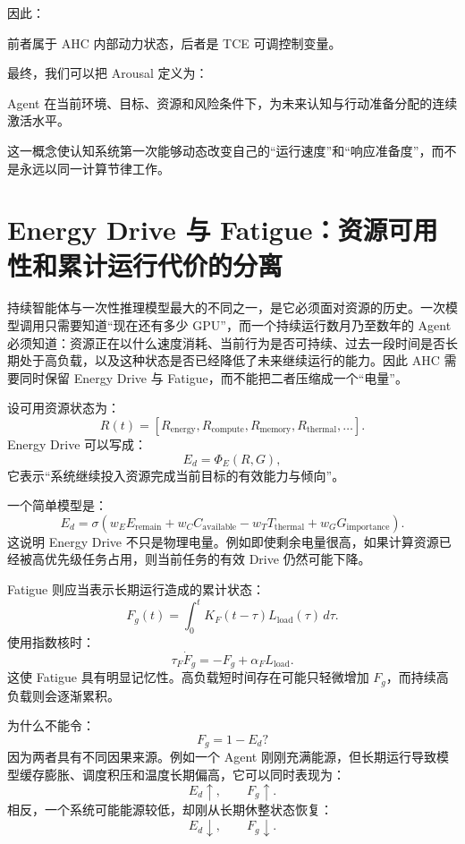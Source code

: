 因此：
\begin{statementbox}
\centering
{}
\end{statementbox}
前者属于 AHC 内部动力状态，后者是 TCE 可调控制变量。

最终，我们可以把 Arousal 定义为：
\begin{definition*}
Agent 在当前环境、目标、资源和风险条件下，为未来认知与行动准备分配的连续激活水平。
\end{definition*}
这一概念使认知系统第一次能够动态改变自己的“运行速度”和“响应准备度”，而不是永远以同一计算节律工作。

\section{Energy Drive 与 Fatigue：资源可用性和累计运行代价的分离}

持续智能体与一次性推理模型最大的不同之一，是它必须面对资源的历史。一次模型调用只需要知道“现在还有多少 GPU”，而一个持续运行数月乃至数年的 Agent 必须知道：资源正在以什么速度消耗、当前行为是否可持续、过去一段时间是否长期处于高负载，以及这种状态是否已经降低了未来继续运行的能力。因此 AHC 需要同时保留 Energy Drive 与 Fatigue，而不能把二者压缩成一个“电量”。

设可用资源状态为：
\[
R(t)
=
[R_{\mathrm{energy}},R_{\mathrm{compute}},R_{\mathrm{memory}},R_{\mathrm{thermal}},\ldots].
\]
Energy Drive 可以写成：
\[
E_d
=
\Phi_E(R,G),
\]
它表示“系统继续投入资源完成当前目标的有效能力与倾向”。

一个简单模型是：
\[
E_d
=
\sigma
\left(
w_E E_{\mathrm{remain}}
+
w_C C_{\mathrm{available}}
-
w_T T_{\mathrm{thermal}}
+
w_G G_{\mathrm{importance}}
\right).
\]
这说明 Energy Drive 不只是物理电量。例如即使剩余电量很高，如果计算资源已经被高优先级任务占用，则当前任务的有效 Drive 仍然可能下降。

Fatigue 则应当表示长期运行造成的累计状态：
\[
F_g(t)
=
\int_0^t
K_F(t-\tau)
L_{\mathrm{load}}(\tau)
\,d\tau .
\]
使用指数核时：
\[
\tau_F\dot F_g
=
-F_g
+
\alpha_F L_{\mathrm{load}}.
\]
这使 Fatigue 具有明显记忆性。高负载短时间存在可能只轻微增加 \(F_g\)，而持续高负载则会逐渐累积。

为什么不能令：
\[
F_g=1-E_d?
\]
因为两者具有不同因果来源。例如一个 Agent 刚刚充满能源，但长期运行导致模型缓存膨胀、调度积压和温度长期偏高，它可以同时表现为：
\[
E_d\uparrow,\qquad F_g\uparrow.
\]
相反，一个系统可能能源较低，却刚从长期休整状态恢复：
\[
E_d\downarrow,\qquad F_g\downarrow.
\]

